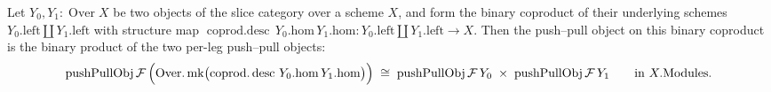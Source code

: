 \begin{lemma}
  \label{lem:pushPull_binary_coprod_prod}
  Let \(Y_0, Y_1 : \operatorname{Over} X\) be two objects of the slice category over a scheme \(X\),
  and form the binary coproduct of their underlying schemes \(Y_0.\mathrm{left} \amalg Y_1.\mathrm{left}\)
  with structure map
  \(\operatorname{coprod.desc}\,Y_0.\mathrm{hom}\,Y_1.\mathrm{hom} : Y_0.\mathrm{left} \amalg
  Y_1.\mathrm{left} \to X\). Then the push--pull object on this binary coproduct is the binary product
  of the two per-leg push--pull objects:
  \[
    \operatorname{pushPullObj}\mathcal{F}\,\Bigl(\operatorname{Over.mk}\bigl(
      \operatorname{coprod.desc}\,Y_0.\mathrm{hom}\,Y_1.\mathrm{hom}\bigr)\Bigr)
      \;\cong\;
    \operatorname{pushPullObj}\mathcal{F}\,Y_0 \;\times\; \operatorname{pushPullObj}\mathcal{F}\,Y_1
    \qquad \text{in } X.\mathrm{Modules}.
  \]
\end{lemma}
